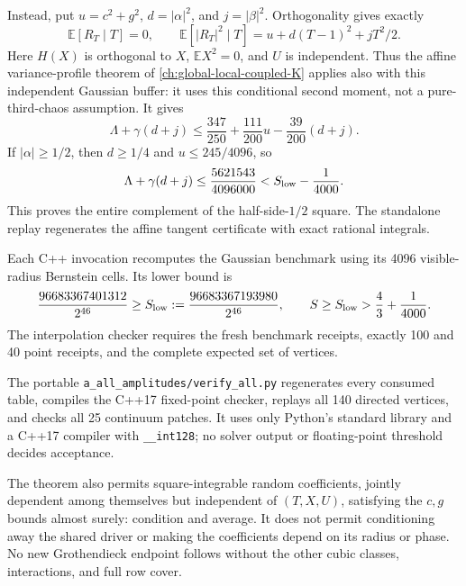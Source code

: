 Instead, put $u=c^2+g^2$, $d=|\alpha|^2$, and $j=|\beta|^2$. Orthogonality gives exactly
\[
 \mathbb E[R_T\mid T]=0,\qquad
 \mathbb E[|R_T|^2\mid T]=u+d(T-1)^2+jT^2/2.
\]
Here $H(X)$ is orthogonal to $X$, $\mathbb EX^2=0$, and $U$ is independent. Thus the affine variance-profile theorem of \autoref{ch:global-local-coupled-K} applies also with this independent Gaussian buffer: it uses this conditional second moment, not a pure-third-chaos assumption. It gives
\[
 \Lambda+\gamma(d+j)\le
 \frac{347}{250}+\frac{111}{200}u-\frac{39}{200}(d+j).
\]
If $|\alpha|\ge1/2$, then $d\ge1/4$ and $u\le245/4096$, so
\[
 \Lambda+\gamma(d+j)\le\frac{5621543}{4096000}
 < S_{\rm low}-\frac1{4000}.
\]
This proves the entire complement of the half-side-$1/2$ square. The standalone replay regenerates the affine tangent certificate with exact rational integrals.

Each C++ invocation recomputes the Gaussian benchmark using its 4096 visible-radius Bernstein cells. Its lower bound is
\[
 \frac{96683367401312}{2^{46}}
 \ge S_{\rm low}:=\frac{96683367193980}{2^{46}},
 \qquad S\ge S_{\rm low}>\frac43+\frac1{4000}.
\]
The interpolation checker requires the fresh benchmark receipts, exactly 100 and 40 point receipts, and the complete expected set of vertices.

The portable \texttt{a\_all\_amplitudes/verify\_all.py} regenerates every consumed table, compiles the C++17 fixed-point checker, replays all 140 directed vertices, and checks all 25 continuum patches. It uses only Python's standard library and a C++17 compiler with \texttt{\_\_int128}; no solver output or floating-point threshold decides acceptance.

The theorem also permits square-integrable random coefficients, jointly dependent among themselves but independent of $(T,X,U)$, satisfying the $c,g$ bounds almost surely: condition and average. It does not permit conditioning away the shared driver or making the coefficients depend on its radius or phase. No new Grothendieck endpoint follows without the other cubic classes, interactions, and full row cover.
